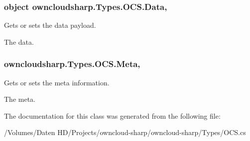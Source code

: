 \subsubsection[{Data}]{\setlength{\rightskip}{0pt plus 5cm}object owncloudsharp.\+Types.\+O\+C\+S.\+Data\hspace{0.3cm}{\ttfamily [get]}, {\ttfamily [set]}}\label{classowncloudsharp_1_1_types_1_1_o_c_s_ad64d4fa0e0f73ba19a0eb97b9d30f2bd}


Gets or sets the data payload. 

The data.\hypertarget{classowncloudsharp_1_1_types_1_1_o_c_s_a7fed97a3502a80df264f5c38651be4c1}{}
\subsubsection[{Meta}]{ owncloudsharp.\+Types.\+O\+C\+S.\+Meta\hspace{0.3cm}{\ttfamily [get]}, {\ttfamily [set]}}\label{classowncloudsharp_1_1_types_1_1_o_c_s_a7fed97a3502a80df264f5c38651be4c1}


Gets or sets the meta information. 

The meta.

The documentation for this class was generated from the following file\+:\begin{DoxyCompactItemize}
\item 
/\+Volumes/\+Daten H\+D/\+Projects/owncloud-\/sharp/owncloud-\/sharp/\+Types/O\+C\+S.\+cs\end{DoxyCompactItemize}
